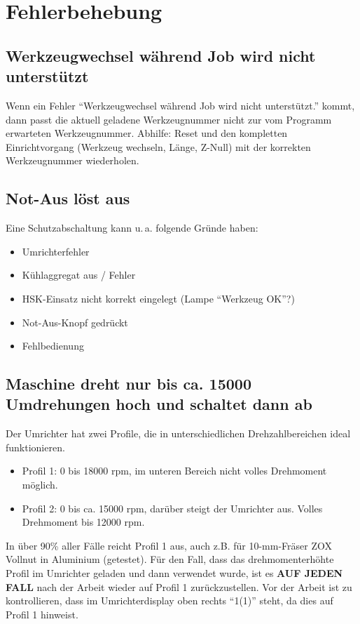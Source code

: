 \documentclass{\basedir/fablab-document}
\begin{document}
\section{Fehlerbehebung}

\subsection{Werkzeugwechsel während Job wird nicht unterstützt}
Wenn ein Fehler \enquote{Werkzeugwechsel während Job wird nicht unterstützt.} kommt, dann passt die aktuell geladene Werkzeugnummer nicht zur vom Programm erwarteten Werkzeugnummer. Abhilfe: Reset und den kompletten Einrichtvorgang (Werkzeug wechseln, Länge, Z-Null) mit der korrekten Werkzeugnummer wiederholen.

\subsection{Not-Aus löst aus}
Eine Schutzabschaltung kann u.\,a. folgende Gründe haben:
\begin{itemize}
	\item Umrichterfehler
	\item Kühlaggregat aus / Fehler
	\item HSK-Einsatz nicht korrekt eingelegt (Lampe \enquote{Werkzeug OK}?)
	\item Not-Aus-Knopf gedrückt
	\item Fehlbedienung
\end{itemize}

\subsection{Maschine dreht nur bis ca. 15000 Umdrehungen hoch und schaltet dann ab}
Der Umrichter hat zwei Profile, die in unterschiedlichen Drehzahlbereichen ideal funktionieren.
\begin{itemize}
	\item Profil 1: 0 bis 18000 rpm, im unteren Bereich nicht volles Drehmoment möglich. 
	\item Profil 2: 0 bis ca. 15000 rpm, darüber steigt der Umrichter aus. Volles Drehmoment bis 12000 rpm.
\end{itemize}
In über 90\% aller Fälle reicht Profil 1 aus, auch z.B. für 10-mm-Fräser ZOX Vollnut in Aluminium (getestet). Für den Fall, dass das drehmomenterhöhte Profil im Umrichter geladen und dann verwendet wurde, ist es \textbf{AUF JEDEN FALL} nach der Arbeit wieder auf Profil 1 zurückzustellen. Vor der Arbeit ist zu kontrollieren, dass im Umrichterdisplay oben rechts \enquote{1(1)} steht, da dies auf Profil 1 hinweist.
\end{document}
